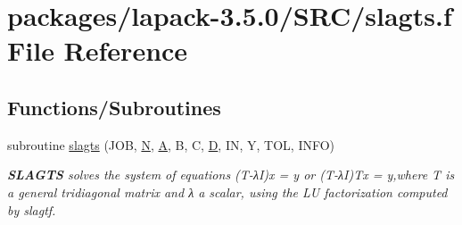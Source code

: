 \hypertarget{slagts_8f}{}\section{packages/lapack-\/3.5.0/\+S\+R\+C/slagts.f File Reference}
\label{slagts_8f}
\subsection*{Functions/\+Subroutines}
\begin{DoxyCompactItemize}
\item 
subroutine \hyperlink{group__auxOTHERauxiliary_gae4b431608960457e61e885f3a2e2b18e}{slagts} (J\+O\+B, \hyperlink{polmisc_8c_a0240ac851181b84ac374872dc5434ee4}{N}, \hyperlink{classA}{A}, B, C, \hyperlink{odrpack_8h_a7dae6ea403d00f3687f24a874e67d139}{D}, I\+N, Y, T\+O\+L, I\+N\+F\+O)
\begin{DoxyCompactList}\small\item\em {\bfseries S\+L\+A\+G\+T\+S} solves the system of equations (T-\/λ\+I)x = y or (T-\/λ\+I)Tx = y,where T is a general tridiagonal matrix and λ a scalar, using the L\+U factorization computed by slagtf. \end{DoxyCompactList}\end{DoxyCompactItemize}
